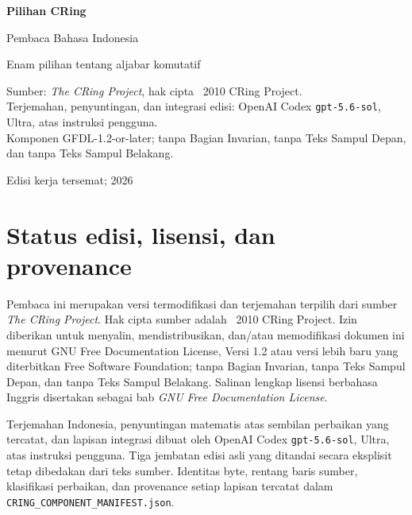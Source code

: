 \documentclass[11pt,openany]{book}
\begin{document}
\begin{titlepage}
  \centering
  \vspace*{0.12\textheight}
  {\Huge\bfseries Pilihan CRing\par}
  \vspace{0.6em}
  {\LARGE Pembaca Bahasa Indonesia\par}
  \vspace{2.5em}
  {\large Enam pilihan tentang aljabar komutatif\par}
  \vfill
  \begin{minipage}{0.82\textwidth}
  \centering
  Sumber: \emph{The CRing Project}, hak cipta \textcopyright\ 2010 CRing Project.\\[0.8em]
  Terjemahan, penyuntingan, dan integrasi edisi: OpenAI Codex
  \texttt{gpt-5.6-sol}, Ultra, atas instruksi pengguna.\\[0.8em]
  Komponen GFDL-1.2-or-later; tanpa Bagian Invarian, tanpa Teks Sampul Depan,
  dan tanpa Teks Sampul Belakang.
  \end{minipage}
  \vfill
  {\small Edisi kerja tersemat; 2026}
\end{titlepage}

\frontmatter

\chapter*{Status edisi, lisensi, dan provenance}

Pembaca ini merupakan versi termodifikasi dan terjemahan terpilih dari sumber
\emph{The CRing Project}. Hak cipta sumber adalah \textcopyright\ 2010 CRing
Project. Izin diberikan untuk menyalin, mendistribusikan, dan/atau memodifikasi
dokumen ini menurut GNU Free Documentation License, Versi 1.2 atau versi lebih
baru yang diterbitkan Free Software Foundation; tanpa Bagian Invarian, tanpa
Teks Sampul Depan, dan tanpa Teks Sampul Belakang. Salinan lengkap lisensi
berbahasa Inggris disertakan sebagai bab \emph{GNU Free Documentation License}.

Terjemahan Indonesia, penyuntingan matematis atas sembilan perbaikan yang
tercatat, dan lapisan integrasi dibuat oleh OpenAI Codex
\texttt{gpt-5.6-sol}, Ultra, atas instruksi pengguna. Tiga jembatan edisi asli
yang ditandai secara eksplisit tetap dibedakan dari teks sumber. Identitas byte,
rentang baris sumber, klasifikasi perbaikan, dan provenance setiap lapisan
tercatat dalam \texttt{CRING\_COMPONENT\_MANIFEST.json}.
\end{document}
